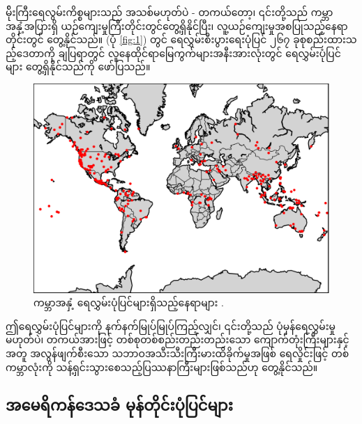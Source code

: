 \documentclass[10pt,twocolumn,letterpaper]{article}
\begin{document}
မ်ိုးကြီးရေလွမ်းကိစ္စများသည် အသစ်မဟုတ်ပဲ - တကယ်တော့၊ ၎င်းတို့သည် ကမ္ဘာအနှံ့အပြားရှိ ယဉ်ကျေးမှုကြီးတိုင်းတွင်တွေ့ရှိနိုင်ပြီး၊ လူ့ယဉ်ကျေးမှုအစပြုသည့်နေရာတိုင်းတွင် တွေ့နိုင်သည်။ (ပုံ \ref{fig:1}) တွင် ရေလွှမ်းစီးပွားရေးပုံပြင် ၂၆၇ ခုစုစည်းထားသည့်ဒေတာကို ချပြရာတွင် \cite{3} လူနေထိုင်ရာမြေကွက်များအနီးအားလုံးတွင် ရေလွှမ်းပုံပြင်များ တွေ့ရှိနိုင်သည်ကို ဖော်ပြသည်။

\begin{figure}[h]
\begin{center}
   \includegraphics[width=1\linewidth]{b.png}
\end{center}
   \caption{ကမ္ဘာအနှံ့ ရေလွှမ်းပုံပြင်များရှိသည့်နေရာများ \cite{3}.}
\label{fig:1}
\label{fig:onecol}
\end{figure}

ဤရေလွှမ်းပုံပြင်များကို နက်နက်မြုပ်မြုပ်ကြည့်လျှင်၊ ၎င်းတို့သည် ပုံမှန်ရေလွှမ်းမှု မဟုတ်ပဲ၊ တကယ်အားဖြင့် တစ်စုတစ်စည်းတည်းတည်းသော ကျောက်တုံးကြီးများနှင့်အတူ အလွန်ဖျက်စီးသော သဘာဝအသီးသီးကြီးမားထိခိုက်မှုအဖြစ် ရေလှိုင်းဖြင့် တစ်ကမ္ဘာလုံးကို သန့်ရှင်းသွားစေသည့်ပြဿနာကြီးများဖြစ်သည်ဟု တွေ့နိုင်သည်။

\subsection{အမေရိကန်ဒေသခံ မုန်တိုင်းပုံပြင်များ}
\end{document}

